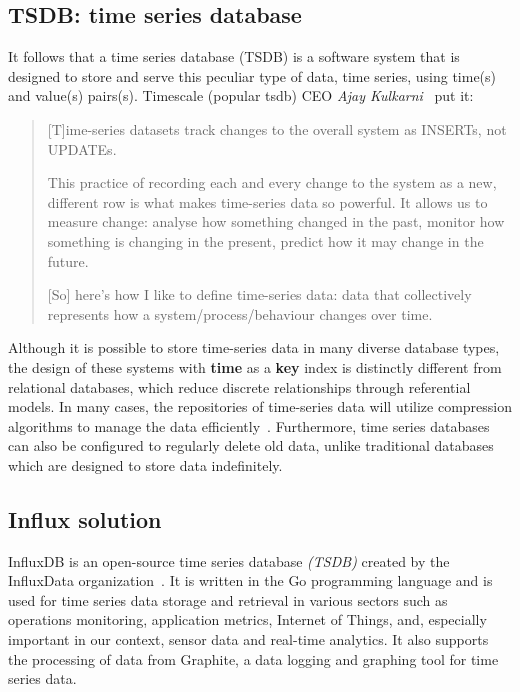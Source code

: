 \subsection{TSDB: time series database}
It follows that a time series database (TSDB) is a software system that is designed to store and serve this peculiar type of data, time series, using time(s) and value(s) pairs(s).
Timescale (popular \ac{tsdb}) CEO \textit{Ajay Kulkarni}~\cite{Misc:asay_why_time_series} put it:
\begin{quote}
    [T]ime-series datasets track changes to the overall system as INSERTs, not UPDATEs.

    This practice of recording each and every change to the system as a new, different row is what makes time-series data so powerful. It allows us to measure change: analyse how something changed in the past, monitor how something is changing in the present, predict how it may change in the future.

        [So] here's how I like to define time-series data: data that collectively represents how a system/process/behaviour changes over time.
\end{quote}
Although it is possible to store time-series data in many diverse database types, the design of these systems with \textbf{time} as a \textbf{key} index is distinctly different from relational databases, which reduce discrete relationships through referential models.
In many cases, the repositories of time-series data will utilize compression algorithms to manage the data efficiently~\cite{Book:devops_cookbook}. Furthermore, time series databases can also be configured to regularly delete old data, unlike traditional databases which are designed to store data indefinitely.

\subsection{Influx solution}
InfluxDB is an open-source time series database \textit{(TSDB)} created by the InfluxData organization~\cite{Misc:influxdata_website}. It is written in the Go programming language and is used for time series data storage and retrieval in various sectors such as operations monitoring, application metrics, Internet of Things, and, especially important in our context, sensor data and real-time analytics. It also supports the processing of data from Graphite, a data logging and graphing tool for time series data.

